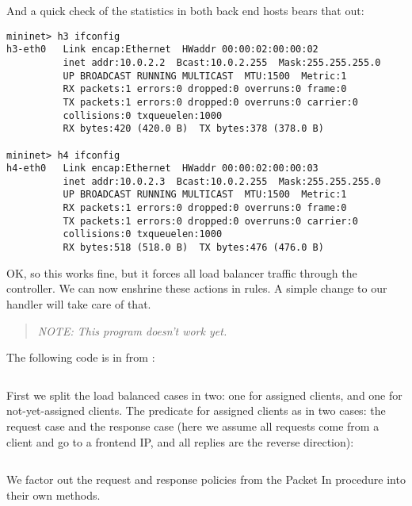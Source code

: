 And a quick check of the statistics in both back end hosts bears that out:

\begin{verbatim}
mininet> h3 ifconfig
h3-eth0   Link encap:Ethernet  HWaddr 00:00:02:00:00:02
          inet addr:10.0.2.2  Bcast:10.0.2.255  Mask:255.255.255.0
          UP BROADCAST RUNNING MULTICAST  MTU:1500  Metric:1
          RX packets:1 errors:0 dropped:0 overruns:0 frame:0
          TX packets:1 errors:0 dropped:0 overruns:0 carrier:0
          collisions:0 txqueuelen:1000
          RX bytes:420 (420.0 B)  TX bytes:378 (378.0 B)

mininet> h4 ifconfig
h4-eth0   Link encap:Ethernet  HWaddr 00:00:02:00:00:03
          inet addr:10.0.2.3  Bcast:10.0.2.255  Mask:255.255.255.0
          UP BROADCAST RUNNING MULTICAST  MTU:1500  Metric:1
          RX packets:1 errors:0 dropped:0 overruns:0 frame:0
          TX packets:1 errors:0 dropped:0 overruns:0 carrier:0
          collisions:0 txqueuelen:1000
          RX bytes:518 (518.0 B)  TX bytes:476 (476.0 B)
\end{verbatim}

OK, so this works fine, but it forces all load balancer traffic through the controller.  We can
now enshrine these actions in rules.  A simple change to our  handler will take
care of that.  

\begin{quotation}
\emph{NOTE:  This program doesn't work yet.}
\end{quotation}

The following code is in from 
:

\inputminted[firstline=75,lastline=85]{python}{code/routing_variants/load_balancer_handler2.py} 

First we split the load balanced cases in two: one for assigned clients, and one for not-yet-assigned
clients.  The predicate for assigned clients as in two cases: the request case and the response case 
(here we assume all requests come from a client and go to a frontend IP, and all replies are the
reverse direction):

\inputminted[firstline=19,lastline=27]{python}{code/routing_variants/load_balancer_handler2.py} 

We factor out the request and response policies from the Packet In procedure into their own methods.

\inputminted[firstline=29,lastline=52]{python}{code/routing_variants/load_balancer_handler2.py} 

